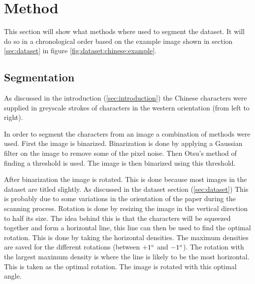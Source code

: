 \section{Method} %
\label{sec:method}

This section will show what methods where used to segment the dataset. It will do so in a chronological order based on the example image shown in section \ref{sec:dataset} in figure \ref{fig:dataset:chinese:example}.

\subsection{Segmentation}


As discussed in the introduction (\ref{sec:introduction}) the Chinese characters were supplied in greyscale strokes of characters in the western orientation (from left to right).

In order to segment the characters from an image a combination of methods were used. First the image is binarized. Binarization is done by applying a Gaussian filter on the image to remove some of the pixel noise. Then Otsu's \cite{otsu}  method of finding a threshold is used. The image is then binarized using this threshold.

After binarization the image is rotated. This is done because most images in the dataset are titled slightly. As discussed in the dataset section (\ref{sec:dataset}) This is probably due to some variations in the orientation of the paper during the scanning process. Rotation is done by resizing the image in the vertical direction to half its size. The idea behind this is that the characters will be squeezed together and form a horizontal line, this line can then be used to find the optimal rotation. This is done by taking the horizontal densities. The maximum densities are saved for the different rotations (between $+1\degree$ and $-1\degree$). The rotation with the largest maximum density is where the line is likely to be the most horizontal. This is taken as the optimal rotation. The image is rotated with this optimal angle.


